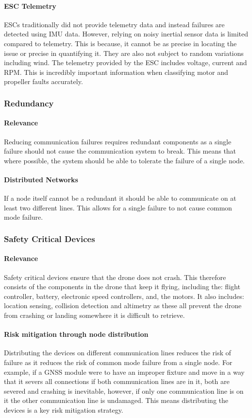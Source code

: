 \paragraph{\gls{ESC} Telemetry}
\gls{ESC}s traditionally did not provide telemetry data and instead failures are detected using \gls{IMU} data. However, relying on noisy inertial sensor data is limited compared to telemetry. This is because, it cannot be as precise in locating the issue or precise in quantifying it. They are also not subject to random variations including wind. The telemetry provided by the \gls{ESC} includes voltage, current and \gls{RPM}. This is incredibly important information when classifying motor and propeller faults accurately.  


\subsubsection{Redundancy}
\paragraph{Relevance}
Reducing communication failures requires redundant components as a single failure should not cause the communication system to break. This means that where possible, the system should be able to tolerate the failure of a single node.
\paragraph{Distributed Networks}
If a node itself cannot be a redundant it should be able to communicate on at least two different lines. This allows for a single failure to not cause common mode failure.


\subsubsection{Safety Critical Devices}
\paragraph{Relevance}
Safety critical devices ensure that the drone does not crash. This therefore consists of the components in the drone that keep it flying, including the: flight controller, battery, electronic speed controllers, and, the motors. It also includes: location sensing,  collision detection and altimetry as these all prevent the drone from crashing or landing somewhere it is difficult to retrieve.
\paragraph{Risk mitigation through node distribution}
Distributing the devices on different communication lines reduces the risk of failure as it reduces the risk of common mode failure from a single node. For example, if a \gls{GNSS} module were to have an improper fixture and move in a way that it severs all connections if both communication lines are in it, both are severed and crashing is inevitable, however, if only one communication line is on it the other communication line is undamaged. This means distributing the devices is a key risk mitigation strategy.

